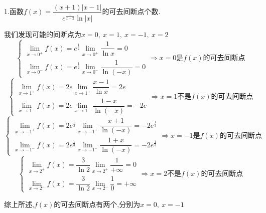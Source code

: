 1.函数$f(x)=\dfrac{(x+1)|x-1|}{e^{\frac{1}{x-2}}\ln|x|}$的可去间断点个数.
\begin{solution}
	
	我们发现可能的间断点为$x=0,\ x=1,\ x=-1,\ x=2$
	$$\left\lbrace
	\begin{array}{l}
		\lim\limits_{x\rightarrow 0^{+}}f(x)=e^{\frac{1}{2}}\lim\limits_{x\rightarrow 0^{+}}\dfrac{1}{\ln x}=0\\
		\lim\limits_{x\rightarrow 0^{-}}f(x)=e^{\frac{1}{2}}\lim\limits_{x\rightarrow 0^{-}}\dfrac{1}{\ln(-x)}=0
	\end{array}
	\right. \Rightarrow x=0\text{是}f(x)\text{的可去间断点}$$
	$$\left\lbrace
	\begin{array}{l}
		\lim\limits_{x\rightarrow 1^{+}}f(x)=2e\lim\limits_{x\rightarrow 1^{+}}\dfrac{x-1}{\ln x}=2e\\
		\lim\limits_{x\rightarrow 1^{-}}f(x)=2e\lim\limits_{x\rightarrow 1^{-}}\dfrac{1-x}{\ln(-x)}=-2e
	\end{array}
	\right. \Rightarrow x=1\text{不是}f(x)\text{的可去间断点}$$
	$$\left\lbrace
	\begin{array}{l}
		\lim\limits_{x\rightarrow -1^{+}}f(x)=2e^{\frac{1}{3}}\lim\limits_{x\rightarrow -1^{+}}\dfrac{x+1}{\ln(-x)}=-2e^{\frac{1}{3}}\\
		\lim\limits_{x\rightarrow -1^{-}}f(x)=2e^{\frac{1}{3}}\lim\limits_{x\rightarrow -1^{-}}\dfrac{1+x}{\ln(-x)}=-2e^{\frac{1}{3}}
	\end{array}
	\right. \Rightarrow x=-1\text{是}f(x)\text{的可去间断点}$$
	$$\left\lbrace
	\begin{array}{l}
		\lim\limits_{x\rightarrow 2^{+}}f(x)=\dfrac{3}{\ln 2}\lim\limits_{x\rightarrow 2^{+}}\dfrac{1}{+\infty}=0\\
		\lim\limits_{x\rightarrow 2^{-}}f(x)=\dfrac{3}{\ln 2}\lim\limits_{x\rightarrow 2^{-}}\dfrac{1}{0}=+\infty
	\end{array}
	\right. \Rightarrow x=2\text{不是}f(x)\text{的可去间断点}$$
	
	综上所述,$f(x)$的可去间断点有两个,分别为$x=0,\ x=-1$
\end{solution} 

